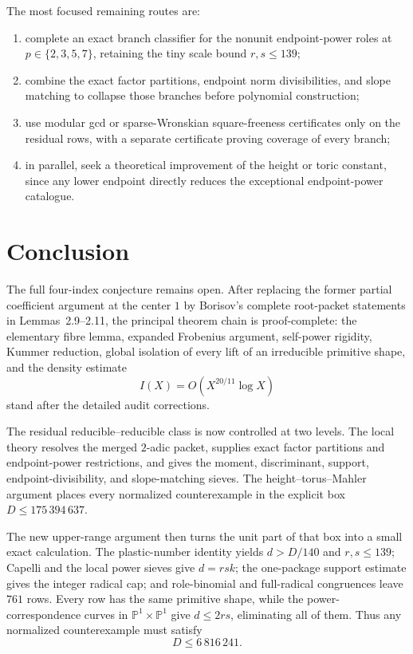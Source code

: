 \documentclass[11pt]{article}
\theoremstyle{definition}
\begin{document}
The most focused remaining routes are:
\begin{enumerate}[label=(\arabic*)]
\item complete an exact branch classifier for the nonunit endpoint-power
roles at \(p\in\{2,3,5,7\}\), retaining the tiny scale bound
\(r,s\leq139\);
\item combine the exact factor partitions, endpoint norm divisibilities,
and slope matching to collapse those branches before polynomial
construction;
\item use modular gcd or sparse-Wronskian square-freeness certificates only
on the residual rows, with a separate certificate proving coverage of every
branch;
\item in parallel, seek a theoretical improvement of the height or toric
constant, since any lower endpoint directly reduces the exceptional
endpoint-power catalogue.
\end{enumerate}

\section*{Conclusion}

The full four-index conjecture remains open.  After replacing the former
partial coefficient argument at the center \(1\) by Borisov's complete
root-packet statements in Lemmas~2.9--2.11, the principal theorem chain is
proof-complete: the elementary fibre lemma, expanded Frobenius argument,
self-power rigidity, Kummer reduction, global isolation of every lift of an
irreducible primitive shape, and the density estimate
\[
 I(X)=O\!\left(X^{20/11}\log X\right)
\]
stand after the detailed audit corrections.

The residual reducible--reducible class is now controlled at two levels.  The
local theory resolves the merged \(2\)-adic packet, supplies exact factor
partitions and endpoint-power restrictions, and gives the moment,
discriminant, support, endpoint-divisibility, and slope-matching sieves.  The
height--torus--Mahler argument places every normalized counterexample in the
explicit box \(D\leq175\,394\,637\).

The new upper-range argument then turns the unit part of that box into a
small exact calculation.  The plastic-number identity yields \(d>D/140\)
and \(r,s\leq139\); Capelli and the local power sieves give
\(d=rsk\); the one-package support estimate gives the integer radical cap;
and role-binomial and full-radical congruences leave \(761\) rows.  Every row
has the same primitive shape, while the power-correspondence curves in
\(\mathbb P^1\times\mathbb P^1\) give \(d\leq2rs\), eliminating all of
them.  Thus any normalized counterexample must satisfy
\[
 \boxed{D\leq6\,816\,241}.
\]
\end{document}
